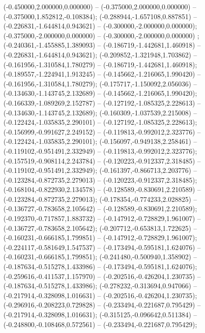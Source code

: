  (-0.450000,2.000000,0.000000) -- (-0.375000,2.000000,0.000000) -- (-0.375000,1.852812,-0.108384);
 (-0.288944,-1.657108,0.887851) -- (-0.226831,-1.644814,0.943621) -- (-0.300000,-2.000000,0.000000);
 (-0.375000,-2.000000,0.000000) -- (-0.300000,-2.000000,0.000000) ;
 (-0.240361,-1.455885,1.389093) -- (-0.186719,-1.442681,1.460918) -- (-0.226831,-1.644814,0.943621);
 (-0.209852,-1.321948,1.703862) -- (-0.161956,-1.310584,1.780279) -- (-0.186719,-1.442681,1.460918);
 (-0.189557,-1.224941,1.913245) -- (-0.145662,-1.216065,1.990420) -- (-0.161956,-1.310584,1.780279);
 (-0.175717,-1.150092,2.056036) -- (-0.134630,-1.143745,2.132689) -- (-0.145662,-1.216065,1.990420);
 (-0.166339,-1.089269,2.152787) -- (-0.127192,-1.085325,2.228613) -- (-0.134630,-1.143745,2.132689);
 (-0.160309,-1.037539,2.215008) -- (-0.122424,-1.035835,2.290101) -- (-0.127192,-1.085325,2.228613);
 (-0.156999,-0.991627,2.249152) -- (-0.119813,-0.992012,2.323776) -- (-0.122424,-1.035835,2.290101);
 (-0.156097,-0.949138,2.258461) -- (-0.119102,-0.951491,2.332949) -- (-0.119813,-0.992012,2.323776);
 (-0.157519,-0.908114,2.243784) -- (-0.120223,-0.912337,2.318485) -- (-0.119102,-0.951491,2.332949);
 (-0.161397,-0.866713,2.203776) -- (-0.123284,-0.872735,2.279013) -- (-0.120223,-0.912337,2.318485);
 (-0.168104,-0.822930,2.134578) -- (-0.128589,-0.830691,2.210589) -- (-0.123284,-0.872735,2.279013);
 (-0.178354,-0.774233,2.028825) -- (-0.136727,-0.783658,2.105642) -- (-0.128589,-0.830691,2.210589);
 (-0.192370,-0.717857,1.883732) -- (-0.147912,-0.728829,1.961007) -- (-0.136727,-0.783658,2.105642);
 (-0.207712,-0.653813,1.722625) -- (-0.160231,-0.666185,1.799851) -- (-0.147912,-0.728829,1.961007);
 (-0.224117,-0.581649,1.547537) -- (-0.173494,-0.595181,1.624076) -- (-0.160231,-0.666185,1.799851);
 (-0.241480,-0.500940,1.358902) -- (-0.187634,-0.515278,1.433986) -- (-0.173494,-0.595181,1.624076);
 (-0.259616,-0.411537,1.157970) -- (-0.202516,-0.426204,1.230735) -- (-0.187634,-0.515278,1.433986);
 (-0.278232,-0.313694,0.947066) -- (-0.217914,-0.328098,1.016631) -- (-0.202516,-0.426204,1.230735);
 (-0.296916,-0.208223,0.729828) -- (-0.233494,-0.221687,0.795429) -- (-0.217914,-0.328098,1.016631);
 (-0.315125,-0.096642,0.511384) -- (-0.248800,-0.108468,0.572561) -- (-0.233494,-0.221687,0.795429);

